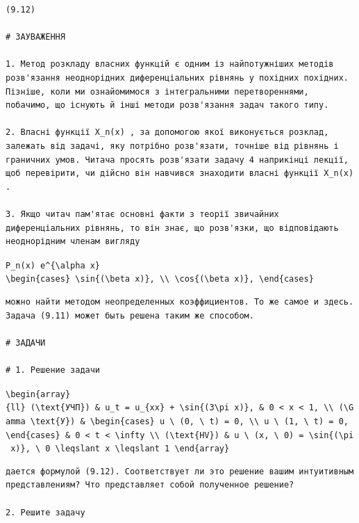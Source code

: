 \documentclass[
  ukrainian,
]{article}
\begin{document}
\begin{verbatim}
(9.12)

# ЗАУВАЖЕННЯ

1. Метод розкладу власних функцій є одним із найпотужніших методів розв'язання неоднорідних диференціальних рівнянь у похідних похідних. Пізніше, коли ми ознайомимося з інтегральними перетвореннями, побачимо, що існують й інші методи розв'язання задач такого типу.

2. Власні функції X_n(x) , за допомогою якої виконується розклад, залежать від задачі, яку потрібно розв'язати, точніше від рівнянь і граничних умов. Читача просять розв'язати задачу 4 наприкінці лекції, щоб перевірити, чи дійсно він навчився знаходити власні функції X_n(x) .

3. Якщо читач пам'ятає основні факти з теорії звичайних диференціальних рівнянь, то він знає, що розв'язки, що відповідають неоднорідним членам вигляду
\end{verbatim}

\texttt{P\_n(x)\ e\^{}\{\textbackslash{}alpha\ x\}}
\texttt{\textbackslash{}begin\{cases\}\ \textbackslash{}sin\{(\textbackslash{}beta\ x)\},\ \textbackslash{}\textbackslash{}\ \textbackslash{}cos\{(\textbackslash{}beta\ x)\},\ \textbackslash{}end\{cases\}}

\begin{verbatim}
можно найти методом неопределенных коэффициентов. То же самое и здесь. Задача (9.11) может быть решена таким же способом.

# ЗАДАЧИ

# 1. Решение задачи
\end{verbatim}

\texttt{\textbackslash{}begin\{array\}\{ll\}\ (\textbackslash{}text\{УЧП\})\ \&\ u\_t\ =\ u\_\{xx\}\ +\ \textbackslash{}sin\{(3\textbackslash{}pi\ x)\},\ \&\ 0\ \textless{}\ x\ \textless{}\ 1,\ \textbackslash{}\textbackslash{}\ (\textbackslash{}Gamma\ \textbackslash{}text\{У\})\ \&\ \textbackslash{}begin\{cases\}\ u\ \textbackslash{}\ (0,\ \textbackslash{}\ t)\ =\ 0,\ \textbackslash{}\textbackslash{}\ u\ \textbackslash{}\ (1,\ \textbackslash{}\ t)\ =\ 0,\ \textbackslash{}end\{cases\}\ \&\ 0\ \textless{}\ t\ \textless{}\ \textbackslash{}infty\ \textbackslash{}\textbackslash{}\ (\textbackslash{}text\{HV\})\ \&\ u\ \textbackslash{}\ (x,\ \textbackslash{}\ 0)\ =\ \textbackslash{}sin\{(\textbackslash{}pi\ x)\},\ \textbackslash{}\ 0\ \textbackslash{}leqslant\ x\ \textbackslash{}leqslant\ 1\ \textbackslash{}end\{array\}}

\begin{verbatim}
дается формулой (9.12). Соответствует ли это решение вашим интуитивным представлениям? Что представляет собой полученное решение?

2. Решите задачу
\end{verbatim}
\end{document}
